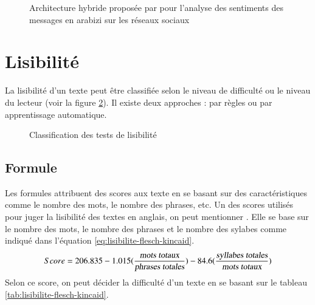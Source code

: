 \documentclass{KodeBook}
\begin{document}
\begin{figure}
	\centering
	\caption{Architecture hybride proposée par \cite{18-guellil-al} pour l'analyse des sentiments des messages en arabizi sur les réseaux sociaux}
	\label{fig:asent-guellil}
\end{figure}

\section{Lisibilité}

La lisibilité d'un texte peut être classifiée selon le niveau de difficulté ou le niveau du lecteur (voir la figure \ref{fig:lisibilite-classif}). 
Il existe deux approches : par règles ou par apprentissage automatique.

\begin{figure}[!ht]
	\centering
	\caption{Classification des tests de lisibilité}
	\label{fig:lisibilite-classif}
\end{figure}

\subsection{Formule}

Les formules attribuent des scores aux texte en se basant sur des caractéristiques comme le nombre des mots, le nombre des phrases, etc. 
Un des scores utilisés pour juger la lisibilité des textes en anglais, on peut mentionner . 
Elle se base sur le nombre des mots, le nombre des phrases et le nombre des sylabes comme indiqué dans l'équation \ref{eq:lisibilite-flesch-kincaid}.
\begin{equation}\label{eq:lisibilite-flesch-kincaid}
Score = 206.835 - 1.015 (\frac{\text{\slshape mots totaux}}{\text{\slshape phrases totales}})
- 84.6 (\frac{\text{\slshape syllabes totales}}{\text{\slshape mots totaux}})
\end{equation}
Selon ce score, on peut décider la difficulté d'un texte en se basant sur le tableau \ref{tab:lisibilite-flesch-kincaid}.
\end{document}
